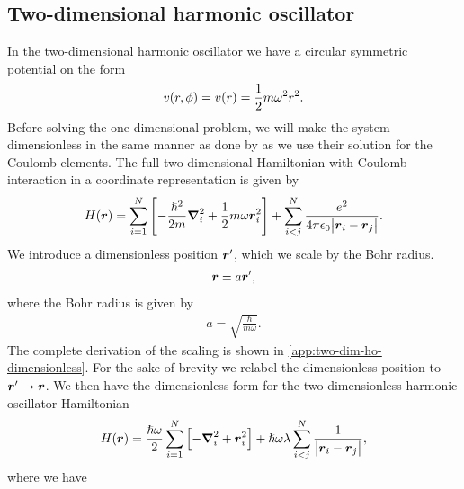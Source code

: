     \subsection{Two-dimensional harmonic oscillator}
        \label{subsec:two-dim-ho}
        In the two-dimensional harmonic oscillator we have a circular symmetric
        potential on the form
        \begin{align}
            v(r, \phi) = v(r) = \frac{1}{2} m \omega^2 r^2.
        \end{align}
        Before solving the one-dimensional problem, we will make the system
        dimensionless in the same manner as done by
        \citeauthor{anisimovas1998energy} \cite{anisimovas1998energy} as we use
        their solution for the Coulomb elements.
        The full two-dimensional Hamiltonian with Coulomb interaction in a
        coordinate representation is given by
        \begin{align}
            H(\boldsymbol{r})
            = \sum_{i = 1}^{N} \left[ 
                -\frac{\hslash^2}{2m} \boldsymbol{\nabla}^2_i
                + \frac{1}{2} m \omega \boldsymbol{r}^2_i
             \right]
            + \sum_{i < j}^{N}
            \frac{e^2}{4\pi \epsilon_0 \abs{\boldsymbol{r}_i - \boldsymbol{r}_j}}.
            \label{eq:two-dim-ho-hamiltonian}
        \end{align}
        We introduce a dimensionless position $\boldsymbol{r}'$, which we scale by the
        Bohr radius.
        \begin{align}
            \boldsymbol{r} = a \boldsymbol{r}',
        \end{align}
        where the Bohr radius is given by
        \begin{align}
            a = \sqrt{\frac{\hslash}{m\omega}}.
            \label{eq:bohr-radius}
        \end{align}
        The complete derivation of the scaling is shown in
        \autoref{app:two-dim-ho-dimensionless}.
        For the sake of brevity we relabel the dimensionless position to
        $\boldsymbol{r}' \to \boldsymbol{r}$.
        We then have the dimensionless form for the two-dimensionless harmonic
        oscillator Hamiltonian
        \begin{align}
            H(\boldsymbol{r})
            = \frac{\hslash\omega}{2} \sum_{i = 1}^{N}\left[ 
                -\boldsymbol{\nabla}^2_i
                + \boldsymbol{r}^2_i
             \right]
            + \hslash\omega\lambda
            \sum_{i < j}^{N}
            \frac{1}{\abs{\boldsymbol{r}_i - \boldsymbol{r}_j}},
        \end{align}
        where we have
